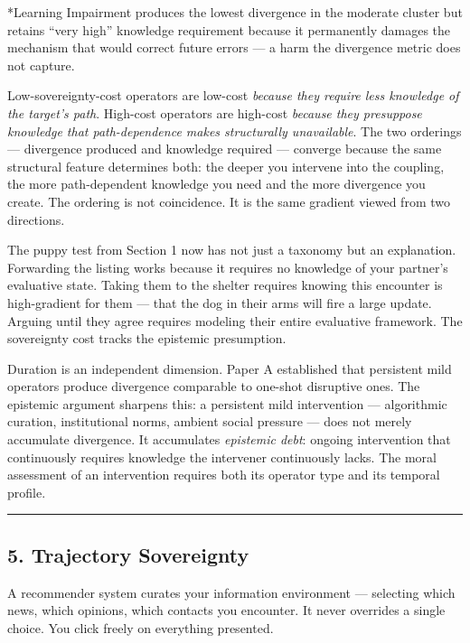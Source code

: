 \documentclass[
]{article}
\begin{document}
*Learning Impairment produces the lowest divergence in the moderate
cluster but retains ``very high'' knowledge requirement because it
permanently damages the mechanism that would correct future errors --- a
harm the divergence metric does not capture.

Low-sovereignty-cost operators are low-cost \emph{because they require
less knowledge of the target's path}. High-cost operators are high-cost
\emph{because they presuppose knowledge that path-dependence makes
structurally unavailable}. The two orderings --- divergence produced and
knowledge required --- converge because the same structural feature
determines both: the deeper you intervene into the coupling, the more
path-dependent knowledge you need and the more divergence you create.
The ordering is not coincidence. It is the same gradient viewed from two
directions.

The puppy test from Section 1 now has not just a taxonomy but an
explanation. Forwarding the listing works because it requires no
knowledge of your partner's evaluative state. Taking them to the shelter
requires knowing this encounter is high-gradient for them --- that the
dog in their arms will fire a large update. Arguing until they agree
requires modeling their entire evaluative framework. The sovereignty
cost tracks the epistemic presumption.

Duration is an independent dimension. Paper A established that
persistent mild operators produce divergence comparable to one-shot
disruptive ones. The epistemic argument sharpens this: a persistent mild
intervention --- algorithmic curation, institutional norms, ambient
social pressure --- does not merely accumulate divergence. It
accumulates \emph{epistemic debt}: ongoing intervention that
continuously requires knowledge the intervener continuously lacks. The
moral assessment of an intervention requires both its operator type and
its temporal profile.

\begin{center}\rule{0.5\linewidth}{0.5pt}\end{center}

\subsection{5. Trajectory Sovereignty}\label{trajectory-sovereignty}

A recommender system curates your information environment --- selecting
which news, which opinions, which contacts you encounter. It never
overrides a single choice. You click freely on everything presented.
\end{document}
